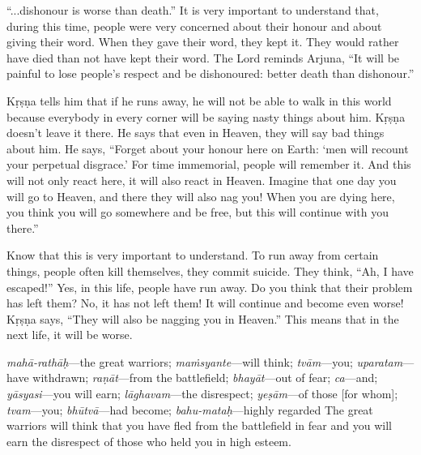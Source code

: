 “...dishonour is worse than death.” It is very important to understand that, during this time, people were very concerned about their honour and about giving their word. When they gave their word, they kept it. They would rather have died than not have kept their word. The Lord reminds Arjuna, “It will be painful to lose people’s respect and be dishonoured: better death than dishonour.”

Kṛṣṇa tells him that if he runs away, he will not be able to walk in this world because everybody in every corner will be saying nasty things about him. Kṛṣṇa doesn’t leave it there. He says that even in Heaven, they will say bad things about him. He says, “Forget about your honour here on Earth: ‘men will recount your perpetual disgrace.’ For time immemorial, people will remember it. And this will not only react here, it will also react in Heaven. Imagine that one day you will go to Heaven, and there they will also nag you! When you are dying here, you think you will go somewhere and be free, but this will continue with you there.”

Know that this is very important to understand. To run away from certain things, people often kill themselves, they commit suicide. They think, “Ah, I have escaped!” Yes, in this life, people have run away. Do you think that their problem has left them? No, it has not left them! It will continue and become even worse! Kṛṣṇa says, “They will also be nagging you in Heaven.” This means that in the next life, it will be worse.

{%
  \textit{mahā-rathāḥ}---the great warriors; 
  \textit{maṁsyante}---will think; 
  \textit{tvām}---you; 
  \textit{uparatam}---have withdrawn; 
  \textit{raṇāt}---from the battlefield; 
  \textit{bhayāt}---out of fear; 
  \textit{ca}---and; 
  \textit{yāsyasi}---you will earn; 
  \textit{lāghavam}---the disrespect; 
  \textit{yeṣām}---of those [for whom]; 
  \textit{tvam}---you; 
  \textit{bhūtvā}---had become; 
  \textit{bahu-mataḥ}---highly regarded
}
{%
  The great warriors will think that you have fled from the battlefield in fear and you will earn the disrespect of those who held you in high esteem.
}

